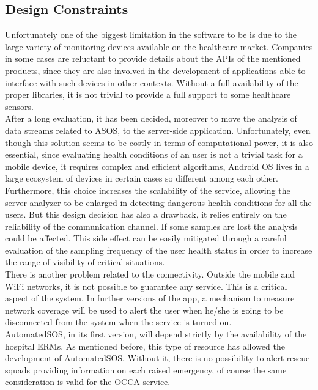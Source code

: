 \paragraph{}


{\color{Blue}\subsection{Design Constraints}}
Unfortunately one of the biggest limitation in the software to be is due to the large variety of monitoring devices available on the healthcare market. Companies in some cases are reluctant to provide details about the APIs of the mentioned products, since they are also involved in the development of applications able to interface with such devices in other contexts. Without a full availability of the proper libraries, it is not trivial to provide a full support to some healthcare sensors. \\
After a long evaluation, it has been decided, moreover to move the analysis of data streams related to ASOS, to the server-side application. Unfortunately, even though this solution seems to be costly in terms of computational power, it is also essential, since evaluating health conditions of an user is not a trivial task for a mobile device, it requires complex and efficient algorithms, Android OS lives in a large ecosystem of devices in certain cases so different among each other. Furthermore, this choice increases the scalability of the service, allowing the server analyzer to be enlarged in detecting dangerous health conditions for all the users. But this design decision has also a drawback, it relies entirely on the reliability of the communication channel. If some samples are lost the analysis could be affected. This side effect can be easily mitigated through a careful evaluation of the sampling frequency of the user health status in order to increase the range of visibility of critical situations.\\
There is another problem related to the connectivity. Outside the mobile and WiFi networks, it is not possible to guarantee any service. This is a critical aspect of the system. In further versions of the app, a mechanism to measure network coverage will be used to alert the user when he/she is going to be disconnected from the system when the service is turned on.\\
AutomatedSOS, in its first version, will depend strictly by the availability of the hospital ERMs. As mentioned before, this type of resource has allowed the development of AutomatedSOS. Without it, there is no possibility to alert rescue squads providing information on each raised emergency, of course the same consideration is valid for the OCCA service.


